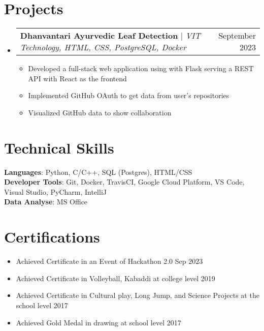 \documentclass[letterpaper,11pt]{article}
\makeatletter
\newcommand{\resumeItem}[1]{
  \item\small{
    {#1 \vspace{-2pt}}
  }
}
\newcommand{\resumeProjectHeading}[2]{
    \item
    \begin{tabular*}{0.97\textwidth}{l@{\extracolsep{\fill}}r}
      \small#1 & #2 \\
    \end{tabular*}\vspace{-7pt}
}
\newcommand{\resumeSubHeadingListStart}{\begin{itemize}[leftmargin=0.15in, label={}]}
\newcommand{\resumeSubHeadingListEnd}{\end{itemize}}
\newcommand{\resumeItemListStart}{\begin{itemize}}
\newcommand{\resumeItemListEnd}{\end{itemize}\vspace{-5pt}}
\makeatother
\begin{document}
\section{Projects}
    \resumeSubHeadingListStart
      \resumeProjectHeading
          {\textbf{Dhanvantari Ayurvedic Leaf Detection} $|$ \emph{VIT Technology, HTML, CSS, PostgreSQL, Docker}}{September 2023}
          \resumeItemListStart
            \resumeItem{Developed a full-stack web application using with Flask serving a REST API with React as the frontend}
            \resumeItem{Implemented GitHub OAuth to get data from user’s repositories}
            \resumeItem{Visualized GitHub data to show collaboration}
          \resumeItemListEnd
    \resumeSubHeadingListEnd



%
\section{Technical Skills}
 \begin{itemize}[leftmargin=0.15in, label={}]
    \small{\item{
     \textbf{Languages}{: Python, C/C++, SQL (Postgres), HTML/CSS} \\
     \textbf{Developer Tools}{: Git, Docker, TravisCI, Google Cloud Platform, VS Code, Visual Studio, PyCharm, IntelliJ} \\
     \textbf{Data Analyse}{: MS Office}
    }}
 \end{itemize}

\section{Certifications}
    \resumeSubHeadingListStart
          \resumeItemListStart
            \resumeItem{Achieved Certificate in an Event of Hackathon 2.0}{Sep 2023}
            \resumeItem{Achieved Certificate in Volleyball, Kabaddi at college level}{2019}
            \resumeItem{Achieved Certificate in Cultural play, Long Jump, and Science Projects at the school level }{2017}
            \resumeItem{Achieved Gold Medal in drawing at school level}{2017}
          \resumeItemListEnd
    \resumeSubHeadingListEnd
   
\end{document}
